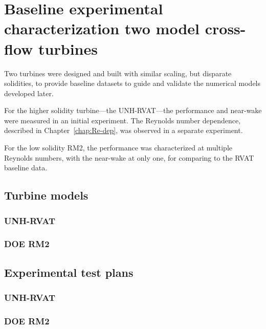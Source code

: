 \chapter{Baseline experimental characterization two model cross-flow turbines}

Two turbines were designed and built with similar scaling, but disparate
solidities, to provide baseline datasets to guide and validate the numerical
models developed later.

For the higher solidity turbine---the UNH-RVAT---the performance and near-wake
were measured in an initial experiment. The Reynolds number dependence,
described in Chapter~\ref{chap:Re-dep}, was observed in a separate experiment.

For the low solidity RM2, the performance was characterized at multiple Reynolds
numbers, with the near-wake at only one, for comparing to the RVAT baseline
data.

\section{Turbine models}

\subsection{UNH-RVAT}

\subsection{DOE RM2}


\section{Experimental test plans}

\subsection{UNH-RVAT}

\subsection{DOE RM2}